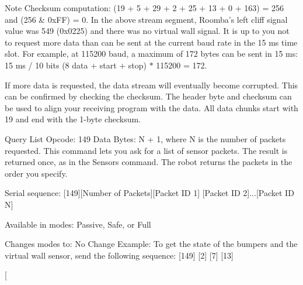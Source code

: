 \begin{Desc}
\begin{description}
\begin{DoxyItemize}
\begin{DoxyNote}{Note}
Checksum computation\+: (19 + 5 + 29 + 2 + 25 + 13 + 0 + 163) = 256 and (256 \& 0x\+F\+F) = 0. In the above stream segment, Roomba’s left cliff signal value was 549 (0x0225) and there was no virtual wall signal. It is up to you not to request more data than can be sent at the current baud rate in the 15 ms time slot. For example, at 115200 baud, a maximum of 172 bytes can be sent in 15 ms\+: 15 ms / 10 bits (8 data + start + stop) $\ast$ 115200 = 172.
\end{DoxyNote}
If more data is requested, the data stream will eventually become corrupted. This can be confirmed by checking the checksum. The header byte and checksum can be used to align your receiving program with the data. All data chunks start with 19 and end with the 1-\/byte checksum. 
\end{DoxyItemize}\item[{\em 
\hypertarget{group__roomba-lib_gga305e17dfb7050ad83ea49ded2e6a2e24a0bf4541e5eb8a17aa5e6550ce5ca70e3}{}R\+O\+O\+M\+B\+A\+\_\+\+Q\+U\+E\+R\+Y\+\_\+\+L\+I\+S\+T\label{group__roomba-lib_gga305e17dfb7050ad83ea49ded2e6a2e24a0bf4541e5eb8a17aa5e6550ce5ca70e3}
}]Query List Opcode\+: 149 Data Bytes\+: N + 1, where N is the number of packets requested. This command lets you ask for a list of sensor packets. The result is returned once, as in the Sensors command. The robot returns the packets in the order you specify.
\begin{DoxyItemize}
\item Serial sequence\+: \mbox{[}149\mbox{]}\mbox{[}Number of Packets\mbox{]}\mbox{[}Packet I\+D 1\mbox{]} \mbox{[}Packet I\+D 2\mbox{]}...\mbox{[}Packet I\+D N\mbox{]}
\item Available in modes\+: Passive, Safe, or Full
\item Changes modes to\+: No Change Example\+: To get the state of the bumpers and the virtual wall sensor, send the following sequence\+: \mbox{[}149\mbox{]} \mbox{[}2\mbox{]} \mbox{[}7\mbox{]} \mbox{[}13\mbox{]} 
\end{DoxyItemize}\item[{\em 
}
\end{description}
\end{Desc}
